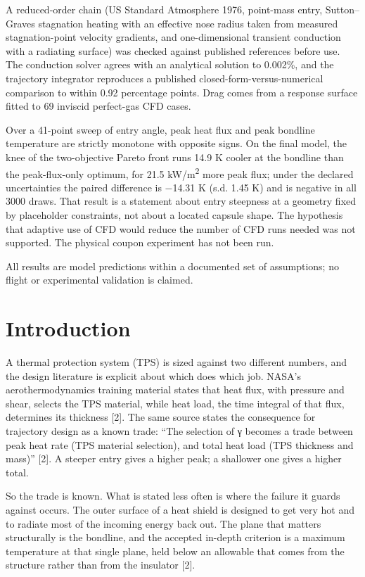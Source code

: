 \documentclass[
  a4paper,
  11pt]{article}
\begin{document}
A reduced-order chain (US Standard Atmosphere 1976, point-mass entry,
Sutton--Graves stagnation heating with an effective nose radius taken
from measured stagnation-point velocity gradients, and one-dimensional
transient conduction with a radiating surface) was checked against
published references before use. The conduction solver agrees with an
analytical solution to 0.002\%, and the trajectory integrator reproduces
a published closed-form-versus-numerical comparison to within 0.92
percentage points. Drag comes from a response surface fitted to 69
inviscid perfect-gas CFD cases.

Over a 41-point sweep of entry angle, peak heat flux and peak bondline
temperature are strictly monotone with opposite signs. On the final
model, the knee of the two-objective Pareto front runs 14.9 K cooler at
the bondline than the peak-flux-only optimum, for 21.5
kW/m\textsuperscript{2} more peak flux; under the declared uncertainties
the paired difference is −14.31 K (s.d. 1.45 K) and is negative in all
3000 draws. That result is a statement about entry steepness at a
geometry fixed by placeholder constraints, not about a located capsule
shape. The hypothesis that adaptive use of CFD would reduce the number
of CFD runs needed was not supported. The physical coupon experiment has
not been run.

All results are model predictions within a documented set of
assumptions; no flight or experimental validation is claimed.

\tableofcontents\clearpage

\section{Introduction}

A thermal protection system (TPS) is sized against two different
numbers, and the design literature is explicit about which does which
job. NASA's aerothermodynamics training material states that heat flux,
with pressure and shear, selects the TPS material, while heat load, the
time integral of that flux, determines its thickness {[}2{]}. The same
source states the consequence for trajectory design as a known trade:
``The selection of γ becomes a trade between peak heat rate (TPS
material selection), and total heat load (TPS thickness and mass)''
{[}2{]}. A steeper entry gives a higher peak; a shallower one gives a
higher total.

So the trade is known. What is stated less often is where the failure it
guards against occurs. The outer surface of a heat shield is designed to
get very hot and to radiate most of the incoming energy back out. The
plane that matters structurally is the bondline, and the accepted
in-depth criterion is a maximum temperature at that single plane, held
below an allowable that comes from the structure rather than from the
insulator {[}2{]}.
\end{document}
